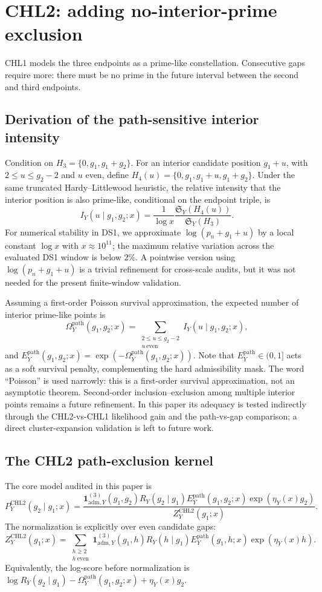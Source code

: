\documentclass[10pt]{article}
\newcommand{\SY}{\mathfrak{S}_Y}
\newcommand{\CHLtwo}{\mathrm{CHL2}}
\newcommand{\Epath}{E_Y^{\mathrm{path}}}
\newcommand{\Omegapath}{\Omega_Y^{\mathrm{path}}}
\begin{document}
\section{CHL2: adding no-interior-prime exclusion}
CHL1 models the three endpoints as a prime-like constellation. Consecutive gaps require more: there must be no prime in the future interval between the second and third endpoints.
\subsection{Derivation of the path-sensitive interior intensity}
Condition on $H_3=\{0,g_1,g_1+g_2\}$. For an interior candidate position $g_1+u$, with $2\le u\le g_2-2$ and $u$ even, define $H_4(u)=\{0,g_1,g_1+u,g_1+g_2\}$. Under the same truncated Hardy--Littlewood heuristic, the relative intensity that the interior position is also prime-like, conditional on the endpoint triple, is
\[
I_Y(u\mid g_1,g_2;x)=\frac{1}{\log x}\frac{\SY(H_4(u))}{\SY(H_3)}.
\]
For numerical stability in DS1, we approximate $\log(p_n+g_1+u)$ by a local constant $\log x$ with $x\approx10^{11}$; the maximum relative variation across the evaluated DS1 window is below $2\%$. A pointwise version using $\log(p_n+g_1+u)$ is a trivial refinement for cross-scale audits, but it was not needed for the present finite-window validation.

Assuming a first-order Poisson survival approximation, the expected number of interior prime-like points is
\[
\Omegapath(g_1,g_2;x)=\sum_{\substack{2\le u\le g_2-2\\u\ \mathrm{even}}} I_Y(u\mid g_1,g_2;x),
\]
and $\Epath(g_1,g_2;x)=\exp(-\Omegapath(g_1,g_2;x))$. Note that $\Epath\in(0,1]$ acts as a soft survival penalty, complementing the hard admissibility mask. The word ``Poisson'' is used narrowly: this is a first-order survival approximation, not an asymptotic theorem. Second-order inclusion--exclusion among multiple interior points remains a future refinement. In this paper its adequacy is tested indirectly through the CHL2-vs-CHL1 likelihood gain and the path-vs-gap comparison; a direct cluster-expansion validation is left to future work.
\subsection{The CHL2 path-exclusion kernel}
The core model audited in this paper is
\[
\boxed{P_Y^{\CHLtwo}(g_2\mid g_1;x)=\frac{\mathbf{1}_{\mathrm{adm},Y}^{(3)}(g_1,g_2)R_Y(g_2\mid g_1)\Epath(g_1,g_2;x)\exp(\eta_Y(x)g_2)}{Z_Y^{\CHLtwo}(g_1;x)}}.
\]
The normalization is explicitly over even candidate gaps:
\[
Z_Y^{\CHLtwo}(g_1;x)=\sum_{\substack{h\ge 2\\h\ \mathrm{even}}}\mathbf{1}_{\mathrm{adm},Y}^{(3)}(g_1,h)R_Y(h\mid g_1)\Epath(g_1,h;x)\exp(\eta_Y(x)h).
\]
Equivalently, the log-score before normalization is $\log R_Y(g_2\mid g_1)-\Omegapath(g_1,g_2;x)+\eta_Y(x)g_2$.
\end{document}
